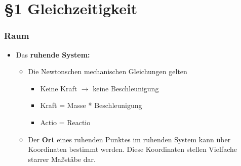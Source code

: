 \documentclass[]{beamer}%
\begin{document}
\section{§1 Gleichzeitigkeit}
\begin{frame}
    \frametitle{Raum}
    \begin{itemize}
        \item Das \textbf{\glqq{}ruhende System\grqq{}:}
        \begin{itemize}
            \item Die Newtonschen mechanischen Gleichungen gelten
            \begin{itemize}
                \item   Keine Kraft $\rightarrow$ keine Beschleunigung
                \item   Kraft = Masse * Beschleunigung
                \item   Actio = Reactio
            \end{itemize}
            \item       Der \textbf{Ort} eines ruhenden Punktes im ruhenden System
                        kann über Koordinaten 
                        bestimmt werden. Diese Koordinaten stellen Vielfache starrer 
                        Maßstäbe dar.
        \end{itemize}
    \end{itemize}
\end{frame}
\end{document}
